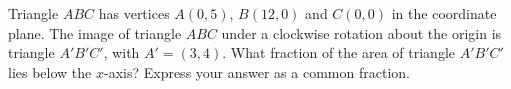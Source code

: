 Triangle $ABC$ has vertices $A(0,5)$, $B(12,0)$ and $C(0,0)$ in the coordinate plane. The image of triangle $ABC$ under a clockwise rotation about the origin is triangle $A'B'C'$, with $A'=(3,4)$. What fraction of the area of triangle $A'B'C'$ lies below the $x$-axis? Express your answer as a common fraction.
